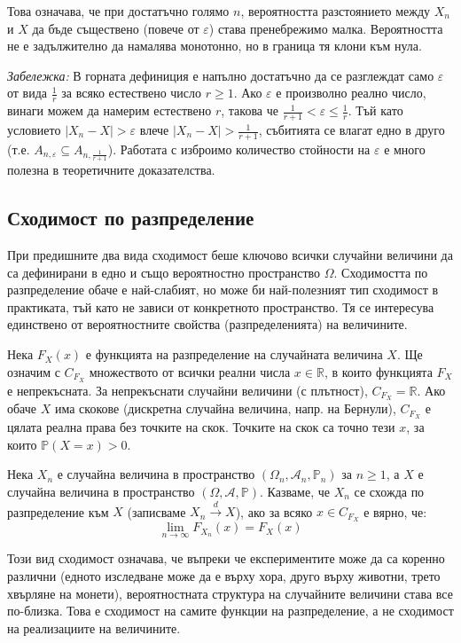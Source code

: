 Това означава, че при достатъчно голямо $n$, вероятността разстоянието между $X_n$ и $X$ да бъде съществено (повече от $\varepsilon$) става пренебрежимо малка. Вероятността не е задължително да намалява монотонно, но в граница тя клони към нула.

\emph{Забележка:} В горната дефиниция е напълно достатъчно да се разглеждат само $\varepsilon$ от вида $\frac{1}{r}$ за всяко естествено число $r \ge 1$. Ако $\varepsilon$ е произволно реално число, винаги можем да намерим естествено $r$, такова че $\frac{1}{r+1} < \varepsilon \le \frac{1}{r}$. Тъй като условието $|X_n - X| > \varepsilon$ влече $|X_n - X| > \frac{1}{r+1}$, събитията се влагат едно в друго (т.е. $A_{n, \varepsilon} \subseteq A_{n, \frac{1}{r+1}}$). Работата с изброимо количество стойности на $\varepsilon$ е много полезна в теоретичните доказателства.

\subsection{Сходимост по разпределение}

При предишните два вида сходимост беше ключово всички случайни величини да са дефинирани в едно и също вероятностно пространство $\Omega$. Сходимостта по разпределение обаче е най-слабият, но може би най-полезният тип сходимост в практиката, тъй като не зависи от конкретното пространство. Тя се интересува единствено от вероятностните свойства (разпределенията) на величините.

Нека $F_X(x)$ е функцията на разпределение на случайната величина $X$. Ще означим с $C_{F_X}$ множеството от всички реални числа $x \in \mathbb{R}$, в които функцията $F_X$ е непрекъсната. За непрекъснати случайни величини (с плътност), $C_{F_X} = \mathbb{R}$. Ако обаче $X$ има скокове (дискретна случайна величина, напр. на Бернули), $C_{F_X}$ е цялата реална права без точките на скок. Точките на скок са точно тези $x$, за които $\mathbb{P}(X = x) > 0$.

\begin{defn}
Нека $X_n$ е случайна величина в пространство $(\Omega_n, \mathcal{A}_n, \mathbb{P}_n)$ за $n \ge 1$, а $X$ е случайна величина в пространство $(\Omega, \mathcal{A}, \mathbb{P})$. Казваме, че $X_n$ се схожда по разпределение към $X$ (записваме $X_n \xrightarrow{d} X$), ако за всяко $x \in C_{F_X}$ е вярно, че:
\[
\lim_{n \to \infty} F_{X_n}(x) = F_X(x)
\]
\end{defn}

Този вид сходимост означава, че въпреки че експериментите може да са коренно различни (едното изследване може да е върху хора, друго върху животни, трето хвърляне на монети), вероятностната структура на случайните величини става все по-близка. Това е сходимост на самите функции на разпределение, а не сходимост на реализациите на величините.

